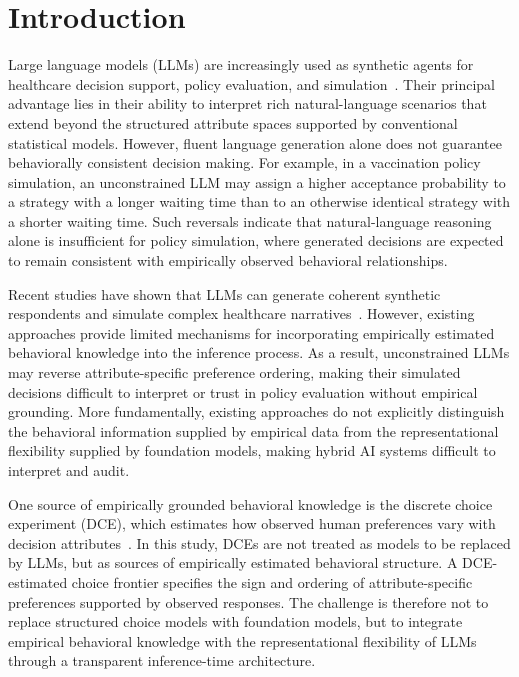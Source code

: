 \documentclass[11pt]{article}
\begin{document}
\clearpage
\section{Introduction}
\label{sec:intro}

Large language models (LLMs) are increasingly used as synthetic agents for healthcare decision support, policy evaluation, and simulation~\citep{Park2023a, Mu2024, VonHoene2025}. Their principal advantage lies in their ability to interpret rich natural-language scenarios that extend beyond the structured attribute spaces supported by conventional statistical models. However, fluent language generation alone does not guarantee behaviorally consistent decision making. For example, in a vaccination policy simulation, an unconstrained LLM may assign a higher acceptance probability to a strategy with a longer waiting time than to an otherwise identical strategy with a shorter waiting time. Such reversals indicate that natural-language reasoning alone is insufficient for policy simulation, where generated decisions are expected to remain consistent with empirically observed behavioral relationships.

Recent studies have shown that LLMs can generate coherent synthetic respondents and simulate complex healthcare narratives~\citep{Aher2022TuringExperiments, Horton2023, santurkar2023whose}. However, existing approaches provide limited mechanisms for incorporating empirically estimated behavioral knowledge into the inference process. As a result, unconstrained LLMs may reverse attribute-specific preference ordering, making their simulated decisions difficult to interpret or trust in policy evaluation without empirical grounding. More fundamentally, existing approaches do not explicitly distinguish the behavioral information supplied by empirical data from the representational flexibility supplied by foundation models, making hybrid AI systems difficult to interpret and audit.

One source of empirically grounded behavioral knowledge is the discrete choice experiment (DCE), which estimates how observed human preferences vary with decision attributes~\citep{Chan2024}. In this study, DCEs are not treated as models to be replaced by LLMs, but as sources of empirically estimated behavioral structure. A DCE-estimated choice frontier specifies the sign and ordering of attribute-specific preferences supported by observed responses. The challenge is therefore not to replace structured choice models with foundation models, but to integrate empirical behavioral knowledge with the representational flexibility of LLMs through a transparent inference-time architecture.
\end{document}
